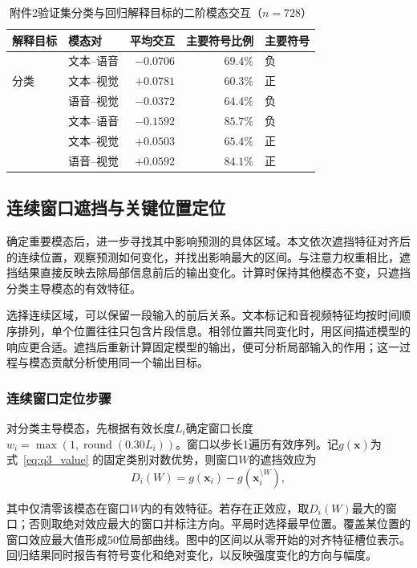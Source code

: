 \begin{table}[htbp]
\centering\small
\caption{附件2验证集分类与回归解释目标的二阶模态交互（$n=728$）}
\label{tab:q3_interaction}
\begin{tabular}{@{}llrrl@{}}
\toprule
解释目标 & 模态对 & 平均交互 & 主要符号比例 & 主要符号\\
\midrule
\multirow{3}{*}{分类} & 文本--语音 & $-0.0706$ & $69.4\%$ & 负\\
 & 文本--视觉 & $+0.0781$ & $60.3\%$ & 正\\
 & 语音--视觉 & $-0.0372$ & $64.4\%$ & 负\\
\addlinespace
\multirow{3}{*}{回归} & 文本--语音 & $-0.1592$ & $85.7\%$ & 负\\
 & 文本--视觉 & $+0.0503$ & $65.4\%$ & 正\\
 & 语音--视觉 & $+0.0592$ & $84.1\%$ & 正\\
\bottomrule
\end{tabular}
\end{table}

\subsection{连续窗口遮挡与关键位置定位}\label{subsec:q3_temporal}
确定重要模态后，进一步寻找其中影响预测的具体区域。本文依次遮挡特征对齐后的连续位置，观察预测如何变化，并找出影响最大的区间。与注意力权重相比，遮挡结果直接反映去除局部信息前后的输出变化。计算时保持其他模态不变，只遮挡分类主导模态的有效特征。

选择连续区域，可以保留一段输入的前后关系。文本标记和音视频特征均按时间顺序排列，单个位置往往只包含片段信息。相邻位置共同变化时，用区间描述模型的响应更合适。遮挡后重新计算固定模型的输出，便可分析局部输入的作用；这一过程与模态贡献分析使用同一个输出目标。

\subsubsection{连续窗口定位步骤}
对分类主导模态，先根据有效长度$L_i$确定窗口长度$w_i=\max(1,\operatorname{round}(0.30L_i))$。窗口以步长1遍历有效序列。记$g(\mathbf x)$为式~\eqref{eq:q3_value} 的固定类别对数优势，则窗口$W$的遮挡效应为
\begin{equation}
D_i(W)=g(\mathbf x_i)-g\!\left(\mathbf x_i^{\setminus W}\right),
\label{eq:q3_occlusion}
\end{equation}

其中仅清零该模态在窗口$W$内的有效特征。若存在正效应，取$D_i(W)$最大的窗口；否则取绝对效应最大的窗口并标注方向。平局时选择最早位置。覆盖某位置的窗口效应最大值形成50位局部曲线。图中的区间以从零开始的对齐特征槽位表示。回归结果同时报告有符号变化和绝对变化，以反映强度变化的方向与幅度。


